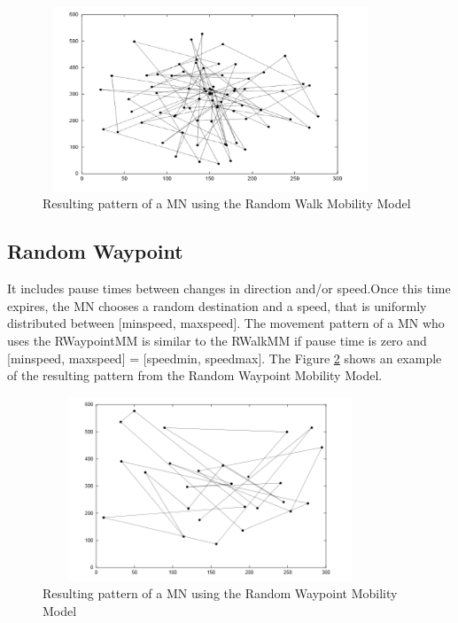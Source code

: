 \begin{figure}[h]
\center
\includegraphics[width=10cm,height=55mm]{../images/randomwalk1.png}
\caption{\label{RandomWalkFig}Resulting pattern of a MN using the Random Walk Mobility Model}
\end{figure}

\newpage
\subsection{Random Waypoint}

It includes pause times between changes in direction and/or speed.Once this time expires, the MN chooses a random destination and a speed, that is uniformly distributed between [minspeed, maxspeed]. The movement pattern of a MN who uses the RWaypointMM is similar to the RWalkMM if pause time is zero and [minspeed, maxspeed] = [speedmin, speedmax]. The Figure \ref{RandomWaypointFig} shows an example of the resulting pattern from the Random Waypoint Mobility Model.\\

\begin{figure}[h]
\center
\includegraphics[width=10cm,height=55mm]{../images/randomwaypoint1.png}
\caption{\label{RandomWaypointFig}Resulting pattern of a MN using the Random Waypoint Mobility Model}
\end{figure}


